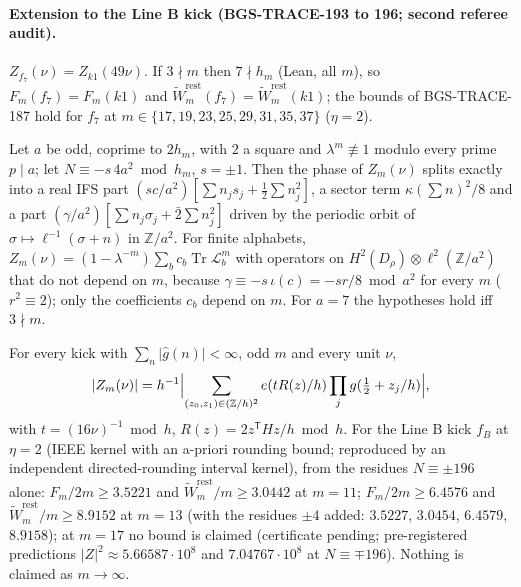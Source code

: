 \paragraph{Extension to the Line B kick (BGS-TRACE-193 to 196; second referee audit).}

\begin{proposition}
\(Z_{f_7}(\nu)=Z_{k1}(49\nu)\). If \(3\nmid m\) then \(7\nmid h_m\) (Lean, all \(m\)), so \(F_m(f_7)=F_m(k1)\) and \(\tilde W^{\mathrm{rest}}_m(f_7)=\tilde W^{\mathrm{rest}}_m(k1)\); the bounds of BGS-TRACE-187 hold for \(f_7\) at \(m\in\{17,19,23,25,29,31,35,37\}\) (\(\eta=2\)).
\end{proposition}

\begin{theorem}
Let \(a\) be odd, coprime to \(2h_m\), with \(2\) a square and \(\lambda^m\not\equiv1\) modulo every prime \(p\mid a\); let \(N\equiv-s\,4a^2\bmod h_m\), \(s=\pm1\).
Then the phase of \(Z_m(\nu)\) splits exactly into a real IFS part \((sc/a^2)[\sum n_js_j+\frac12\sum n_j^2]\), a sector term \(\kappa(\sum n)^2/8\) and a part \((\gamma/a^2)[\sum n_j\sigma_j+\bar{2}\sum n_j^2]\) driven by the periodic orbit of \(\sigma\mapsto\ell^{-1}(\sigma+n)\) in \(\mathbb Z/a^2\).
For finite alphabets, \(Z_m(\nu)=(1-\lambda^{-m})\sum_bc_b\operatorname{Tr}\mathcal L_b^m\) with operators on \(H^2(D_\rho)\otimes\ell^2(\mathbb Z/a^2)\) that do not depend on \(m\), because \(\gamma\equiv-s\,\iota(c)=-sr/8\bmod a^2\) for every \(m\) (\(r^2\equiv2\)); only the coefficients \(c_b\) depend on \(m\). For \(a=7\) the hypotheses hold iff \(3\nmid m\).
\end{theorem}

\begin{theorem}[Exact orbit formula and certified bounds for the Line B kick, BGS-TRACE-195, proved (computer-assisted; \(m=11,13\) only)]
For every kick with \(\sum_n\lvert\hat g(n)\rvert<\infty\), odd \(m\) and every unit \(\nu\),
\[\lvert Z_m(\nu)\rvert=h^{-1}\Bigl\lvert\sum_{(z_0,z_1)\in(\mathbb Z/h)^2}e(tR(z)/h)\prod_jg(\tfrac12+z_j/h)\Bigr\rvert,\]
with \(t=(16\nu)^{-1}\bmod h\), \(R(z)=2z^{\mathsf T}Hz/h\bmod h\).
For the Line B kick \(f_B\) at \(\eta=2\) (IEEE kernel with an a-priori rounding bound; reproduced by an independent directed-rounding interval kernel), from the residues \(N\equiv\pm196\) alone: \(F_m/2m\ge3.5221\) and \(\tilde W^{\mathrm{rest}}_m/m\ge3.0442\) at \(m=11\); \(F_m/2m\ge6.4576\) and \(\tilde W^{\mathrm{rest}}_m/m\ge8.9152\) at \(m=13\) (with the residues \(\pm4\) added: \(3.5227\), \(3.0454\), \(6.4579\), \(8.9158\)); at \(m=17\) no bound is claimed (certificate pending; pre-registered predictions \(\lvert Z\rvert^2\approx5.66587\cdot10^8\) and \(7.04767\cdot10^8\) at \(N\equiv\mp196\)). Nothing is claimed as \(m\to\infty\).
\end{theorem}

